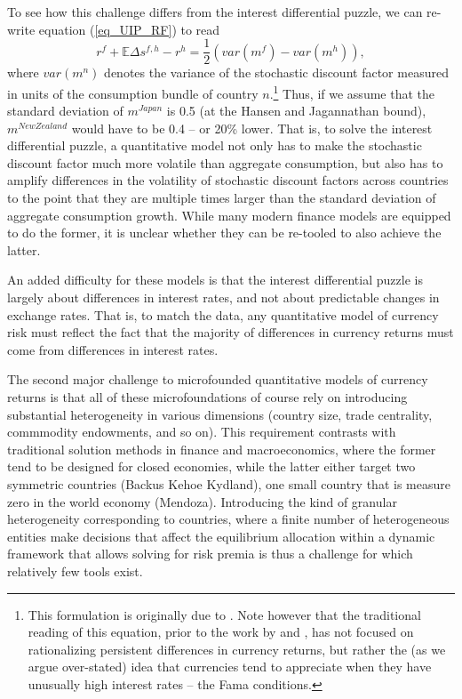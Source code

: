 \documentclass{ar-1col}
\begin{document}
To see how this challenge differs from the interest differential puzzle, we can re-write equation (\ref{eq_UIP_RF}) to read \begin{equation}
  r^{f} +\mathbb{E} \Delta  s^{f,h} - r^{h} =\frac{1}{2}\left(var(m^f)-var(m^h)\right),
\end{equation} where $var(m^n)$ denotes the variance of the stochastic discount factor measured in units of the consumption bundle of country $n$.\footnote{This formulation is originally due to 
\cite{Backusetal2001}. Note however that the traditional reading of this equation, prior to the work by \cite{LustigRoussanovVerdelhan2011} and \cite{HassanMano2015}, has not focused on rationalizing persistent differences in currency returns, but rather the (as we argue over-stated) idea that currencies tend to appreciate when they have unusually high interest rates -- the Fama conditions.} Thus, if we assume that the standard deviation of $m^{Japan}$ is 0.5 (at the Hansen and Jagannathan bound), $m^{New Zealand}$ would have to be 0.4 -- or 20\% lower. That is, to solve the interest differential puzzle, a quantitative model not only has to make the stochastic discount factor much more volatile than aggregate consumption, but also has to amplify differences in the volatility of stochastic discount factors across countries to the point that they are multiple times larger than the standard deviation of aggregate consumption growth. While many modern finance models are equipped to do the former, it is unclear whether they can be re-tooled to also achieve the latter. 

An added difficulty for these models is that the interest differential puzzle is largely about differences in interest rates, and not about predictable changes in exchange rates. That is, to match the data, any quantitative model of currency risk must reflect the fact that the majority of differences in currency returns must come from differences in interest rates. 

The second major challenge to microfounded quantitative models of currency returns is that all of these microfoundations of course rely on introducing substantial heterogeneity in various dimensions (country size, trade centrality, commmodity endowments, and so on). This requirement contrasts with traditional solution methods in finance and macroeconomics, where the former tend to be designed for closed economies, while the latter either target two symmetric countries (Backus Kehoe Kydland), one small country that is measure zero in the world economy (Mendoza). Introducing the kind of granular heterogeneity corresponding to countries, where a finite number of heterogeneous entities make decisions that affect the equilibrium allocation within a dynamic framework that allows solving for risk premia is thus a challenge for which relatively few tools exist. 
\end{document}
